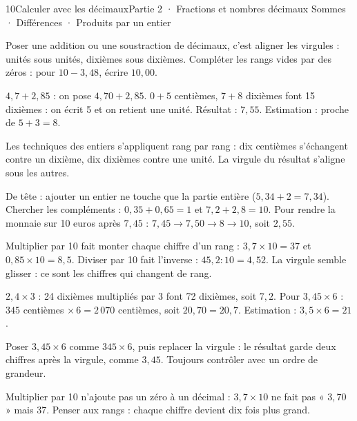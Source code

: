\begin{ouverture}[calcul]{10}{Calculer avec les décimaux}{Partie 2 · Fractions et nombres décimaux}
{Sommes · Différences · Produits par un entier}
\end{ouverture}
\pagestyle{otMain}\essentiel\fontsize{11}{15}\selectfont
{}\label{cours-10-1}
\begin{savoirfaire}Poser une addition ou une soustraction de décimaux, c’est aligner les virgules : unités sous unités, dixièmes sous dixièmes. Compléter les rangs vides par des zéros : pour $10-3{,}48$, écrire $10{,}00$.\end{savoirfaire}
\begin{exemple}$4{,}7+2{,}85$ : on pose $4{,}70+2{,}85$. $0+5$ centièmes, $7+8$ dixièmes font 15 dixièmes : on écrit 5 et on retient une unité. Résultat : $7{,}55$. Estimation : proche de $5+3=8$.\end{exemple}
\begin{propriete}Les techniques des entiers s’appliquent rang par rang : dix centièmes s’échangent contre un dixième, dix dixièmes contre une unité. La virgule du résultat s’aligne sous les autres.\end{propriete}
\begin{savoirfaire}De tête : ajouter un entier ne touche que la partie entière ($5{,}34+2=7{,}34$). Chercher les compléments : $0{,}35+0{,}65=1$ et $7{,}2+2{,}8=10$. Pour rendre la monnaie sur 10 euros après $7{,}45$ : $7{,}45\to7{,}50\to8\to10$, soit $2{,}55$.\end{savoirfaire}
\clearpage
{}\label{cours-10-2}
\begin{propriete}Multiplier par 10 fait monter chaque chiffre d’un rang : $3{,}7\times10=37$ et $0{,}85\times10=8{,}5$. Diviser par 10 fait l’inverse : $45{,}2:10=4{,}52$. La virgule semble glisser : ce sont les chiffres qui changent de rang.\end{propriete}
\begin{exemple}$2{,}4\times3$ : 24 dixièmes multipliés par 3 font 72 dixièmes, soit $7{,}2$. Pour $3{,}45\times6$ : $345$ centièmes $\times\,6=2\,070$ centièmes, soit $20{,}70=20{,}7$. Estimation : $3{,}5\times6=21$.\end{exemple}
\begin{savoirfaire}Poser $3{,}45\times6$ comme $345\times6$, puis replacer la virgule : le résultat garde deux chiffres après la virgule, comme $3{,}45$. Toujours contrôler avec un ordre de grandeur.\end{savoirfaire}
\begin{attention}Multiplier par 10 n’ajoute pas un zéro à un décimal : $3{,}7\times10$ ne fait pas « $3{,}70$ » mais 37. Penser aux rangs : chaque chiffre devient dix fois plus grand.\end{attention}

